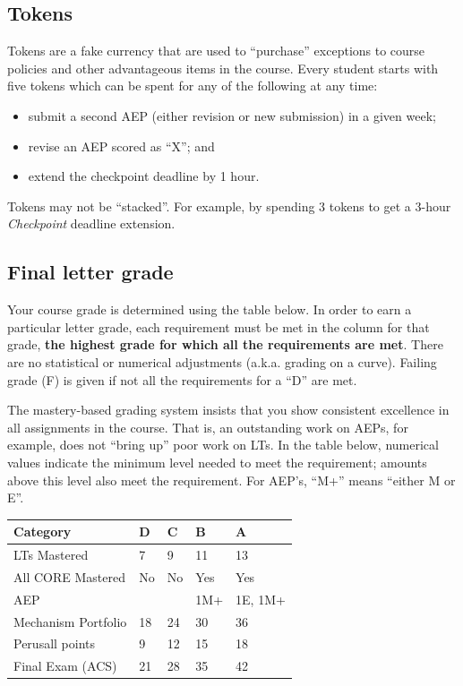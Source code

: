 \hypertarget{tokens}{%
\subsection{Tokens}\label{tokens}}

Tokens are a fake currency that are used to ``purchase'' exceptions to
course policies and other advantageous items in the course. Every
student starts with five tokens which can be spent for any of the
following at any time:

\begin{itemize}
\tightlist
\item
  submit a second AEP (either revision or new submission) in a given
  week;
\item
  revise an AEP scored as ``X''; and
\item
  extend the checkpoint deadline by 1 hour.
\end{itemize}

Tokens may not be ``stacked''. For example, by spending 3 tokens to get
a 3-hour \emph{Checkpoint} deadline extension.

\hypertarget{final-letter-grade}{%
\subsection{Final letter grade}\label{final-letter-grade}}

Your course grade is determined using the table below. In order to earn
a particular letter grade, each requirement must be met in the column
for that grade, \textbf{the highest grade for which all the requirements
are met}. There are no statistical or numerical adjustments (a.k.a.
grading on a curve). Failing grade (F) is given if not all the
requirements for a ``D'' are met.

The mastery-based grading system insists that you show consistent
excellence in all assignments in the course. That is, an outstanding
work on AEPs, for example, does not ``bring up'' poor work on LTs. In
the table below, numerical values indicate the minimum level needed to
meet the requirement; amounts above this level also meet the
requirement. For AEP's, ``M+'' means ``either M or E''.

\begin{longtable}[]{@{}lllll@{}}
\toprule
Category & D & C & B & A \\
\midrule
\endhead
LTs Mastered & 7 & 9 & 11 & 13 \\
All CORE Mastered & No & No & Yes & Yes \\
AEP & & & 1M+ & 1E, 1M+ \\
Mechanism Portfolio & 18 & 24 & 30 & 36 \\
Perusall points & 9 & 12 & 15 & 18 \\
Final Exam (ACS) & 21 & 28 & 35 & 42 \\
\bottomrule
\end{longtable}

